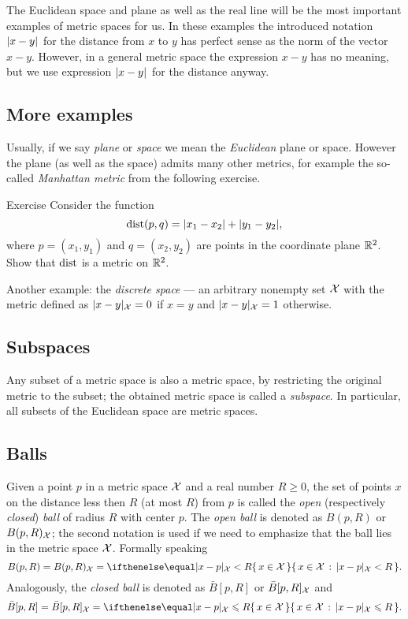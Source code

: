 The Euclidean space and plane as well as the real line will be the most important examples of metric spaces for us.
In these examples the introduced notation $\dist{x}{y}{}$ for the distance from $x$ to $y$ has perfect sense as the norm of the vector $x-y$.
However, in a general metric space the expression $x-y$ has no meaning, but we use expression $\dist{x}{y}{}$ for the distance anyway.

\subsection*{More examples}

Usually, if we say {}\emph{plane} or {}\emph{space} we mean the {}\emph{Euclidean} plane or space.
However the plane (as well as the space) admits many other metrics, for example the so-called \emph{Manhattan metric} from the following exercise.

\begin{thm}{Exercise}\label{ex:ell-infty}
Consider the function
$$\mathop{\rm dist}\nolimits(p,q)=|x_1-x_2|+|y_1-y_2|,$$
where $p=(x_1,y_1)$ and $q=(x_2,y_2)$ are points in the coordinate plane $\mathbb{R}^2$.
Show that $\mathop{\rm dist}\nolimits$ is a metric on $\mathbb{R}^2$.
\end{thm}

Another example: the \emph{discrete space} --- an arbitrary nonempty set $\mathcal{X}$ with the metric defined as $\dist{x}{y}{\spc{X}}=0$ if $x=y$ and $\dist{x}{y}{\spc{X}}=1$ otherwise.

\subsection*{Subspaces}
Any subset of a metric space is also a metric space, by restricting the original metric to the subset;
the obtained metric space is called a \emph{subspace}.
In particular, all subsets of the Euclidean space are metric spaces.

\subsection*{Balls}
Given a point $p$ in a metric space $\mathcal{X}$ and a real number $R\ge 0$, the set of points $x$ on the distance less then $R$ (at most $R$) from $p$ is called the \emph{open} (respectively \emph{closed}) \emph{ball} of radius $R$ with center $p$.
The {}\emph{open ball} is denoted as $B(p,R)$ or $B(p,R)_{\mathcal{X}}$;
the second notation is used if we need to emphasize that the ball lies in the metric space $\mathcal{X}$.
Formally speaking
\[B(p,R)=B(p,R)_{\spc{X}}=\set{x\in \spc{X}}{\dist{x}{p}{\spc{X}}< R}.\]
Analogously, the {}\emph{closed ball} is denoted as $\bar B[p,R]$ or $\bar B[p,R]_{\mathcal{X}}$ and
\[\bar B[p,R]=\bar B[p,R]_{\spc{X}}=\set{x\in \spc{X}}{\dist{x}{p}{\spc{X}}\le R}.\]

